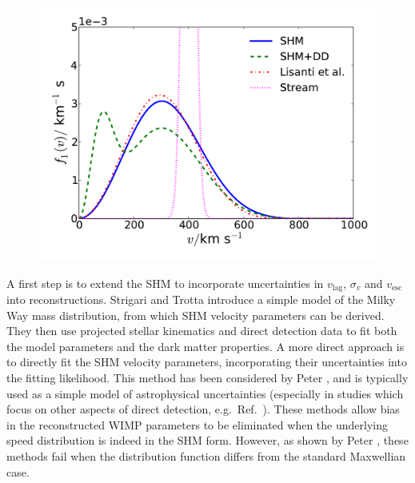 \begin{figure}[h]
  \includegraphics[width=\textwidth]{SpeedDistributions.pdf}
  \caption[Examples of dark matter speed distributions]{}
  \label{fig:DD:SpeedDists}
\end{figure}

A first step is to extend the SHM to incorporate uncertainties in $v_\textrm{lag}$, $\sigma_v$ and $v_\textrm{esc}$ into reconstructions. Strigari and Trotta \cite{Strigari:2009} introduce a simple model of the Milky Way mass distribution, from which SHM velocity parameters can be derived. They then use projected stellar kinematics and direct detection data to fit both the model parameters and the dark matter properties. A more direct approach is to directly fit the SHM velocity parameters, incorporating their uncertainties into the fitting likelihood. This method has been considered by Peter \cite{Peter:2010}, and is typically used as a simple model of astrophysical uncertainties (especially in studies which focus on other aspects of direct detection, e.g.\ Ref.~\cite{Arina:2013}). These methods allow bias in the reconstructed WIMP parameters to be eliminated when the underlying speed distribution is indeed in the SHM form. However, as shown by Peter \cite{Peter:2011}, these methods fail when the distribution function differs from the standard Maxwellian case.

